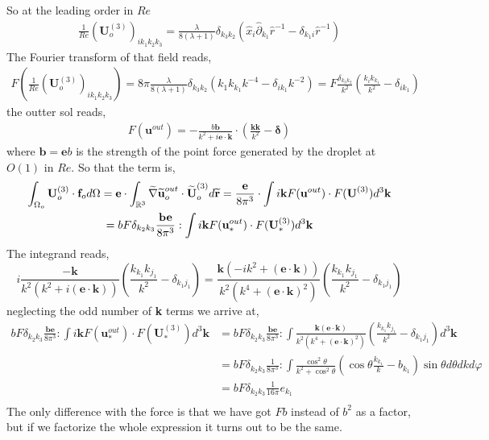 So at the leading order in $Re$
\begin{align*}
    \frac{1}{Re}(\textbf{U}^{(3)}_o)_{ik_1k_2k_3}
    =
    \frac{\lambda}{8(\lambda+1)} \delta_{k_3 k_2 } ( \hat{x}_i\hat{\partial}_{k_1} \hat{r}^{-1}
    - \delta_{k_1 i} \hat{r}^{-1})
\end{align*}
The Fourier transform of that field reads,
\begin{align}
    F(\frac{1}{Re}(\textbf{U}^{(3)}_o)_{ik_1k_2k_3}) =
    8\pi \frac{\lambda}{8(\lambda+1)} \delta_{k_3 k_2 } (
        k_1 k_{k_1} k^{-4}
        - \delta_{i k_1} k^{-2}
    )
    =
    F\frac{\delta_{k_3k_2}}{k^2}\left(
        \frac{k_ik_{k_1}}{k^2}
        -\delta_{ik_1}
    \right)
\end{align}
the outter sol reads, 
\begin{align}
    F(\textbf{u}^{out})
    = 
    -\frac{b\textbf{b}}{k^2  + i \textbf{e}\cdot \textbf{k}}\cdot (\frac{\textbf{kk}}{k^2} - \bm\delta)
\end{align}
where $\textbf{b} = \textbf{e}b$ is the strength of the point force generated by the droplet at $O(1)$ in $Re$.
So that the term is,
\begin{multline}
    \intO[o]{\textbf{U}_{o}^{(3)}\cdot \textbf{f}_{o}}
    =
    \textbf{e}\cdot 
    \int_{\mathbb{R}^3}  \wt{\grad}  \wt{\textbf{u}}_{o}^{out}\cdot \wt{\textbf{U}}_{o}^{(3)} d\wt{\textbf{r}}
    =
    \frac{\textbf{e}}{8\pi^3}\cdot \int
    i \textbf{k} F(\textbf{u}^{out}) \cdot F(\textbf{U}^{(3)}) d^3 \textbf{k}\\
    =
    b F \delta_{k_2k_3}\frac{\textbf{be}}{8\pi^3} : \int
    i \textbf{k} F(\textbf{u}^{out}_*) \cdot F(\textbf{U}^{(3)}_*) d^3 \textbf{k}
\end{multline}
The integrand reads, 
\begin{equation*}
    i \frac{- \textbf{k}}{k^2(k^2  + i (\textbf{e}\cdot \textbf{k}))} (\frac{k_{k_1}k_{j_1}}{k^2} - \delta_{k_1j_1})   
    =
    \frac{ \textbf{k}(-ik^2  + (\textbf{e}\cdot \textbf{k}))}{k^2(k^4  + (\textbf{e}\cdot \textbf{k})^2)} (\frac{k_{k_1}k_{j_1}}{k^2} - \delta_{k_1j_1})   
\end{equation*}
neglecting the odd number of \textbf{k} terms we arrive at, 
\begin{align}
    b F \delta_{k_2k_3}\frac{\textbf{be}}{8\pi^3} : \int
    i \textbf{k} F(\textbf{u}^{out}_*) \cdot F(\textbf{U}^{(3)}_*) d^3 \textbf{k}
    &=
    b F \delta_{k_2k_3}\frac{\textbf{be}}{8\pi^3} : 
    \int
    \frac{ \textbf{k} (\textbf{e}\cdot \textbf{k})}{k^2(k^4  + (\textbf{e}\cdot \textbf{k})^2)} (\frac{k_{k_1}k_{j_1}}{k^2} - \delta_{k_1j_1})  d^3 \textbf{k}\\
    &=
    b F \delta_{k_2k_3}\frac{1}{8\pi^3} : 
    \int
    \frac{ \cos^2\theta }{k^2  +  \cos^2\theta} (\cos\theta\frac{k_{k_1}}{k} - b_{k_1})  \sin\theta d\theta dk d\varphi\\
    &=
    b F \delta_{k_2k_3}\frac{1}{16\pi} e_{k_1} 
    \\
\end{align}
The only difference with the force is that we have got $Fb$ instead of $b^2$ as a factor, but if we factorize the whole expression it turns out to be the same. 

